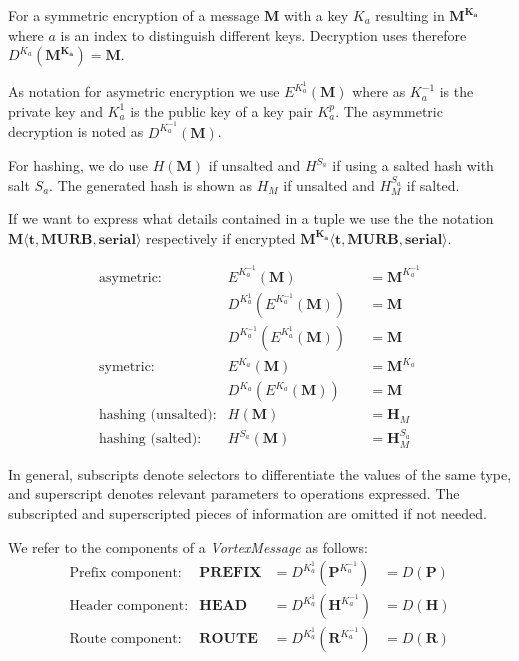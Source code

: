 For a symmetric encryption of a message $\mathbf{M}$ with a key $K_a$ resulting in $\mathbf{M^{K_a}}$ where $a$ is an index to distinguish different keys. Decryption uses therefore $D^{K_a}(\mathbf{M^{K_a}})=\mathbf{M}$.

As notation for asymetric encryption we use $E^{K^{1}_a}(\mathbf{M})$ where as $K^{-1}_a$ is the private key and $K^{1}_a$ is the public key of a key pair $K^p_a$. The asymmetric decryption is noted as $D^{K^{-1}_a}(\mathbf{M})$.

For hashing, we do use $H(\mathbf{M})$ if unsalted and $H^{S_a}$ if using a salted hash with salt $S_a$. The generated hash is shown as $H_M$ if unsalted and $H^{S_a}_M$ if salted.

If we want to express what details contained in a tuple we use the the notation $\mathbf{M\langle t,MURB,serial\rangle }$ respectively if encrypted $\mathbf{M^{K_{a}}\langle t,MURB,serial\rangle}$.

\begin{align*}
\text{asymetric:}         & E^{K^{-1}_a}\left(\mathbf{M}\right)                            && =\mathbf{M}^{K^{-1}_a}\\
& D^{K^{1}_a}\left(E^{K^{-1}_a}\left(\mathbf{M}\right)\right)    && =\mathbf{M}\\
& D^{K^{-1}_a}\left(E^{K^{1}_a}\left(\mathbf{M}\right)\right)    && =\mathbf{M}\\
\text{symetric:}          & E^{K_a}\left(\mathbf{M}\right)                                 && =\mathbf{M}^{K_a}\\
& D^{K_a}\left(E^{K_a}\left(\mathbf{M}\right)\right)          && =\mathbf{M}\\
\text{hashing (unsalted):}& H\left(\mathbf{M}\right)                                       && =\mathbf{H}_M\\
\text{hashing (salted):}  & H^{S_a}\left(\mathbf{M}\right)                                 && =\mathbf{H}^{S_a}_M
\end{align*}

In general, subscripts denote selectors to differentiate the values of the same type, and superscript denotes relevant parameters to operations expressed. The subscripted and superscripted pieces of information are omitted if not needed.

We refer to the components of a \emph{VortexMessage} as follows:
\begin{align*}
\text{Prefix component:}         & \mathbf{PREFIX}                 &=D^{K^{1}_a}\left(\mathbf{P}^{K^{-1}_a}\right) &=D\left(\mathbf{P}\right)\\
\text{Header component:}         & \mathbf{HEAD}                 &=D^{K^{1}_a}\left(\mathbf{H}^{K^{-1}_a}\right) &=D\left(\mathbf{H}\right)\\
\text{Route component:}         & \mathbf{ROUTE}                 &=D^{K^{1}_a}\left(\mathbf{R}^{K^{-1}_a}\right) &=D\left(\mathbf{R}\right)\\
\end{align*}

